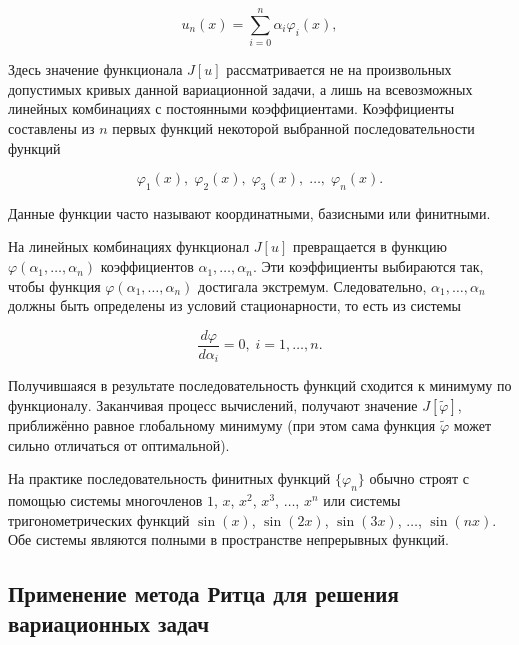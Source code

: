 \documentclass{article}
\begin{document}
\begin{displaymath}
	u_{n}(x) = \sum_{i=0}^n \alpha_{i}\varphi_{i}(x),
\end{displaymath}

\noindent Здесь значение функционала $J[u]$ рассматривается не на произвольных допустимых кривых данной вариационной задачи, а лишь на всевозможных линейных комбинациях с постоянными коэффициентами. Коэффициенты составлены из $n$ первых функций некоторой выбранной последовательности функций

\begin{displaymath}
	\varphi_{1}(x), \; \varphi_{2}(x), \; \varphi_{3}(x), \; \ldots, \; \varphi_{n}(x).
\end{displaymath}

\begin{info}
	Данные функции часто называют координатными, базисными или финитными.
\end{info}

На линейных комбинациях функционал $J[u]$ превращается в функцию $\varphi(\alpha_{1}, \ldots, \alpha_{n})$ коэффициентов $\alpha_{1}, \ldots, \alpha_{n}$. Эти коэффициенты выбираются так, чтобы функция $\varphi(\alpha_{1}, \ldots, \alpha_{n})$ достигала экстремум. Следовательно, $\alpha_{1}, \ldots, \alpha_{n}$ должны быть определены из условий стационарности, то есть из системы

\begin{displaymath}
	\frac{d\varphi}{d\alpha_{i}} = 0, \; i = 1, \ldots, n.
\end{displaymath}

Получившаяся в результате последовательность функций сходится к минимуму по функционалу. Заканчивая процесс вычислений, получают значение $J[\widetilde{\varphi}]$, приближённо равное глобальному минимуму (при этом сама функция $\widetilde{\varphi}$ может сильно отличаться от оптимальной).

На практике последовательность финитных функций ${\lbrace \varphi_{n} \rbrace}$ обычно строят с помощью системы многочленов $1$, $x$, $x^2$, $x^3$, $\ldots$, $x^n$ или системы тригонометрических функций $\sin (x)$, $\sin (2x)$, $\sin (3x)$, $\ldots$, $\sin (nx)$. Обе системы являются полными в пространстве непрерывных функций.

\subsection{Применение метода Ритца для решения вариационных задач}
\end{document}
